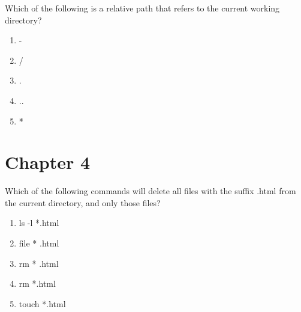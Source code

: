 \documentclass{beamer}
\begin{document}
\begin{frame}[fragile]

Which of the following is a relative path that refers to the current working directory?

\begin{enumerate}[label=\Alph*)]

\item -

\item /

\item .

\item ..

\item *

\end{enumerate}

\end{frame}


\section{Chapter 4}

\begin{frame}[fragile]

Which of the following commands will delete all files with the suffix .html from the current directory, and only those files?

\begin{enumerate}[label=\Alph*)]

\item ls -l *.html

\item file * .html

\item rm * .html

\item rm *.html

\item touch *.html

\end{enumerate}

\end{frame}
\end{document}
